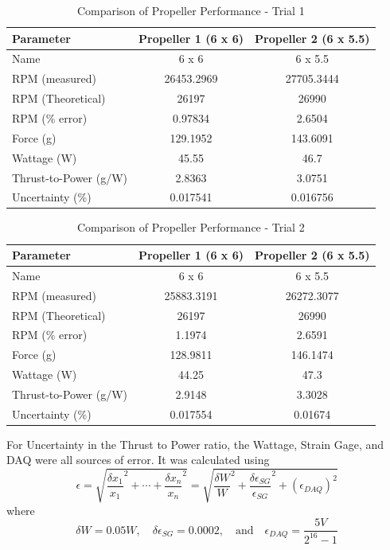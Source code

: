 \documentclass{article}
\begin{document}
\begin{table}[H]
  \centering
  \begin{tabular}{lcc}
  \hline
  \textbf{Parameter} & \textbf{Propeller 1 (6 x 6)} & \textbf{Propeller 2 (6 x 5.5)} \\
  \hline
  Name & 6 x 6 & 6 x 5.5 \\
  RPM (measured) & 26453.2969 & 27705.3444 \\
  RPM (Theoretical) & 26197 & 26990 \\
  RPM (\% error) & 0.97834 & 2.6504 \\
  Force (g) & 129.1952 & 143.6091 \\
  Wattage (W) & 45.55 & 46.7 \\
  Thrust-to-Power (g/W) & 2.8363 & 3.0751 \\
  Uncertainty (\%) & 0.017541 & 0.016756 \\
  \hline
  \end{tabular}
  \caption{Comparison of Propeller Performance - Trial 1}
  \label{table:propeller_comparison1}
  \end{table}

  
\begin{table}[h!]
  \centering
  \begin{tabular}{lcc}
  \hline
  \textbf{Parameter} & \textbf{Propeller 1 (6 x 6)} & \textbf{Propeller 2 (6 x 5.5)} \\
  \hline
  Name & 6 x 6 & 6 x 5.5 \\
  RPM (measured) & 25883.3191 & 26272.3077 \\
  RPM (Theoretical) & 26197 & 26990 \\
  RPM (\% error) & 1.1974 & 2.6591 \\
  Force (g) & 128.9811 & 146.1474 \\
  Wattage (W) & 44.25 & 47.3 \\
  Thrust-to-Power (g/W) & 2.9148 & 3.3028 \\
  Uncertainty (\%) & 0.017554 & 0.01674 \\
  \hline
  \end{tabular}
  \caption{Comparison of Propeller Performance - Trial 2}
  \label{table:propeller_performance2}
  \end{table}
  
  For Uncertainty in the Thrust to Power ratio, the Wattage, Strain Gage, and DAQ were all sources of error. It was calculated using \begin{equation}
    \epsilon = \sqrt{ \frac{\delta x_1}{x_1}^2 + \cdots + \frac{\delta x_n}{x_n}^2} = \sqrt{ \frac{\delta W}{W}^2 + \frac{\delta \epsilon_{SG}}{\epsilon_{SG}}^2 + (\epsilon_{DAQ})^2}
   \end{equation}
   where \begin{equation}
    \delta W = 0.05 W, \quad \delta \epsilon_{SG} = 0.0002, \quad \text{and} \quad \epsilon_{DAQ} = \frac{5V}{2^{16}-1} 
  \end{equation} 
\end{document}
